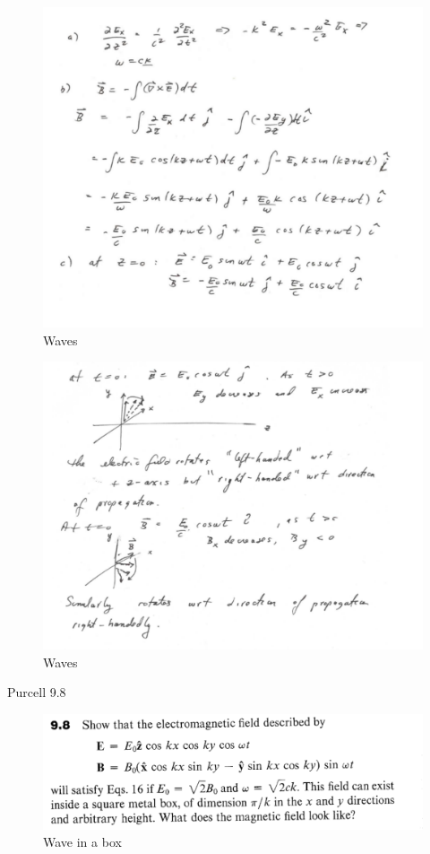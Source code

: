 \documentclass[makesolutionspdf]{esg8022pset}
\begin{document}
\begin{solution}
\begin{figure}[H]
    \centering
    \includegraphics[width = 15cm]{waves2sola}
   \caption{Waves}
  \end{figure}
  \begin{figure}[H]
    \centering
    \includegraphics[width = 15cm]{waves2solb}
   \caption{Waves}
  \end{figure}
\end{solution}


\begin{problem}{Purcell 9.8}
\begin{figure}[H]
    \centering
    \includegraphics[width = 15cm]{pu908}
    \caption{Wave in a box}
  \end{figure}

\end{problem}
\end{document}
